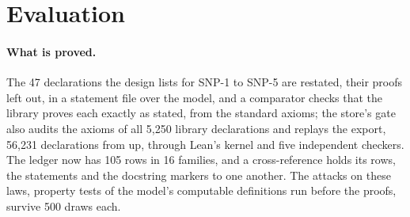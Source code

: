 \documentclass[11pt]{article}
\theoremstyle{plain}
\theoremstyle{definition}
\newcommand{\lean}[1]{\path{#1}}
\begin{document}
\section{Evaluation}\label{sec:eval}

\paragraph{What is proved.}
The 47 declarations the design lists for SNP-1 to SNP-5 are restated, their proofs left out, in a
statement file over the model, and a comparator checks that the library proves each exactly as
stated, from the standard axioms; the store's gate also audits the axioms of all 5{,}250 library
declarations and replays the export, 56{,}231 declarations from \lean{Init} up, through Lean's
kernel and five independent checkers. The ledger now has 105 rows in 16 families, and a
cross-reference holds its rows, the statements and the docstring markers to one another. The
attacks on these laws, property tests of the model's computable definitions run before the proofs,
survive 500 draws each.
\end{document}
